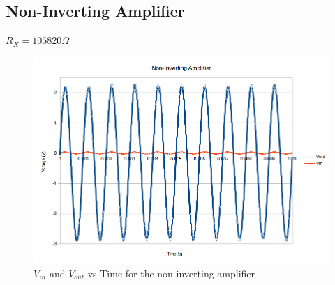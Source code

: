 \documentclass[10pt]{article}
\begin{document}
\subsection*{Non-Inverting Amplifier}
$R_X = 105820 \Omega$
\begin{figure}[H]
	\centering
	\includegraphics[width=\textwidth]{NonInvertingAmp.png}
	\caption{$V_{in}$ and $V_{out}$ vs Time for the non-inverting amplifier}
\end{figure}
\end{document}
